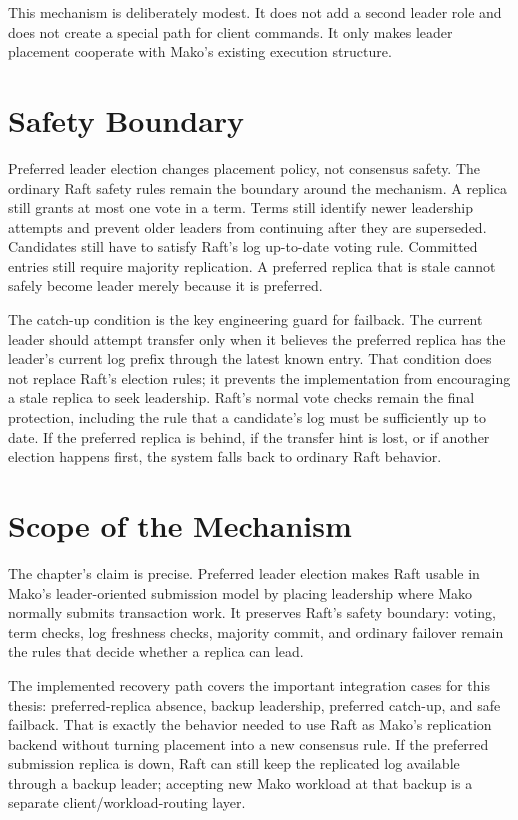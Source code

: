 This mechanism is deliberately modest. It does not add a second leader role and
does not create a special path for client commands. It only makes leader
placement cooperate with Mako's existing execution structure.

\section{Safety Boundary}

Preferred leader election changes placement policy, not consensus safety. The
ordinary Raft safety rules remain the boundary around the mechanism. A replica
still grants at most one vote in a term. Terms still identify newer leadership
attempts and prevent older leaders from continuing after they are superseded.
Candidates still have to satisfy Raft's log up-to-date voting rule. Committed
entries still require majority replication. A preferred replica that is stale
cannot safely become leader merely because it is preferred.

The catch-up condition is the key engineering guard for failback. The current
leader should attempt transfer only when it believes the preferred replica has
the leader's current log prefix through the latest known entry. That condition
does not replace Raft's election rules; it prevents the implementation from
encouraging a stale replica to seek leadership. Raft's normal vote checks
remain the final protection, including the rule that a candidate's log must be
sufficiently up to date. If the preferred replica is behind, if the transfer
hint is lost, or if another election happens first, the system falls back to
ordinary Raft behavior.

\section{Scope of the Mechanism}

The chapter's claim is precise. Preferred leader election makes Raft usable in
Mako's leader-oriented submission model by placing leadership where Mako
normally submits transaction work. It preserves Raft's safety boundary: voting,
term checks, log freshness checks, majority commit, and ordinary failover remain
the rules that decide whether a replica can lead.

The implemented recovery path covers the important integration cases for this
thesis: preferred-replica absence, backup leadership, preferred catch-up, and
safe failback. That is exactly the behavior needed to use Raft as Mako's
replication backend without turning placement into a new consensus rule. If the
preferred submission replica is down, Raft can still keep the replicated log
available through a backup leader; accepting new Mako workload at that backup is
a separate client/workload-routing layer.


